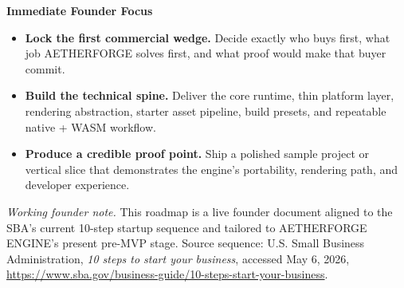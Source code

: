 \documentclass[10pt]{article}
\begin{document}
\normalsize
\textbf{Immediate Founder Focus}
\begin{itemize}
  \item \textbf{Lock the first commercial wedge.} Decide exactly who buys first, what job AETHERFORGE solves first, and what proof would make that buyer commit.
  \item \textbf{Build the technical spine.} Deliver the core runtime, thin platform layer, rendering abstraction, starter asset pipeline, build presets, and repeatable native + WASM workflow.
  \item \textbf{Produce a credible proof point.} Ship a polished sample project or vertical slice that demonstrates the engine's portability, rendering path, and developer experience.
\end{itemize}

\vspace{0.25em}
{\small \textit{Working founder note.} This roadmap is a live founder document aligned to the SBA's current 10-step startup sequence and tailored to AETHERFORGE ENGINE's present pre-MVP stage. Source sequence: U.S. Small Business Administration, \textit{10 steps to start your business}, accessed May 6, 2026, \url{https://www.sba.gov/business-guide/10-steps-start-your-business}.}
\end{document}
